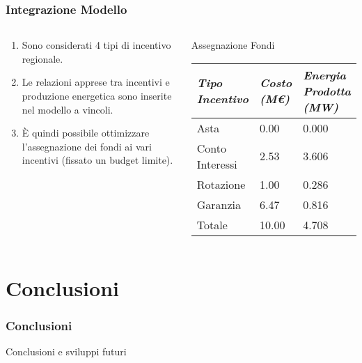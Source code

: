 \documentclass{beamer}
\begin{document}
  	\begin{frame}
		\frametitle{Integrazione Modello}
		\begin{columns}
		\begin{block}{}
			\begin{enumerate}
				\item Sono considerati 4 tipi di incentivo regionale.
				\item Le relazioni apprese tra incentivi e produzione energetica sono inserite nel modello a vincoli.
				\item \`E quindi possibile ottimizzare l'assegnazione dei fondi ai vari incentivi (fissato un budget limite).
			\end{enumerate}
		\end{block}
		\begin{block}{Assegnazione Fondi}
			\begin{table}[h]
				\centering
				\begin{tabular}{ p{}  | p{0.15\textwidth} | p{}  }
					\hline \hline 
					\nohyphens{\emph{Tipo Incentivo}} & \nohyphens{\emph{Costo (M\euro)}} & \nohyphens{\emph{Energia Prodotta (MW)}} \\ \hline
					Asta &  0.00 & 0.000 \\ 
					\nohyphens{Conto Interessi} & 2.53 & 3.606 \\ 
					Rotazione & 1.00 & 0.286 \\ 
					Garanzia & 6.47 & 0.816 \\ \hline 
					Totale & 10.00 & 4.708 \\
					\hline \hline 
				\end{tabular}
				\label{tab:assegnFondi10M}	
			\end{table}
		\end{block}
		\end{columns}
  	\end{frame}
  
\section{Conclusioni}
	\begin{frame}
		\frametitle{Conclusioni}
		Conclusioni e sviluppi futuri
	\end{frame}
  
\end{document}
